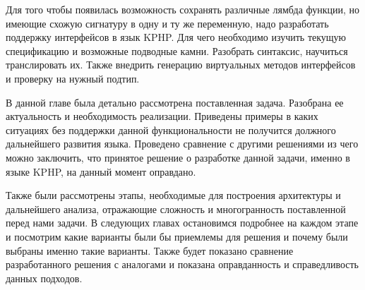 Для того чтобы появилась возможность сохранять различные лямбда функции, но имеющие схожую сигнатуру в одну и ту же переменную, надо разработать поддержку интерфейсов в язык KPHP.
Для чего необходимо изучить текущую спецификацию и возможные подводные камни.
Разобрать синтаксис, научиться транслировать их.
Также внедрить генерацию виртуальных методов интерфейсов и проверку на нужный подтип.

\chapterconclusion
В данной главе была детально рассмотрена поставленная задача.
Разобрана ее актуальность и необходимость реализации.
Приведены примеры в каких ситуациях без поддержки данной функциональности не получится должного дальнейшего развития языка.
Проведено сравнение с другими решениями из чего можно заключить, что принятое решение о разработке данной задачи, именно в языке KPHP, на данный момент оправдано.

Также были рассмотрены этапы, необходимые для построения архитектуры и дальнейшего анализа, отражающие сложность и многогранность поставленной перед нами задачи.
В следующих главах остановимся подробнее на каждом этапе и посмотрим какие варианты были бы приемлемы для решения и почему были выбраны именно такие варианты.
Также будет показано сравнение разработанного решения с аналогами и показана оправданность и справедливость данных подходов.
